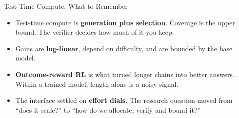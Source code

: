 \begin{frame}{Test-Time Compute: What to Remember}
    \begin{itemize}\itemsep0.6em
        \item Test-time compute is \textbf{generation plus selection}. Coverage is the upper bound. The verifier decides how much of it you keep.
        \item Gains are \textbf{log-linear}, depend on difficulty, and are bounded by the base model.
        \item \textbf{Outcome-reward RL} is what turned longer chains into better answers. Within a trained model, length alone is a noisy signal.
        \item The interface settled on \textbf{effort dials}. The research question moved from ``does it scale?'' to ``how do we allocate, verify and bound it?''
    \end{itemize}
    \vspace{0.3em}
    \vspace{0.3em}
\end{frame}
